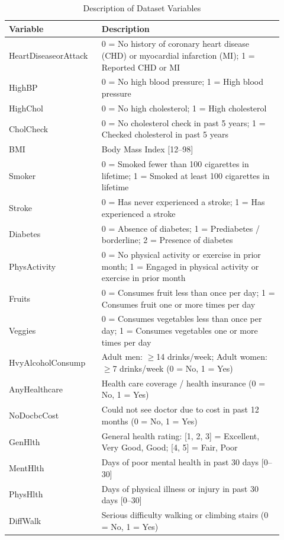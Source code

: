 \documentclass[11pt,a4paper]{article}
\begin{document}
\begin{table}[t]
\centering
\caption{Description of Dataset Variables}
\label{tab:vars}
\small
\begin{tabular}{p{0.3\linewidth}p{0.62\linewidth}}
\toprule
Variable & Description \\
\midrule
HeartDiseaseorAttack & 0 = No history of coronary heart disease (CHD) or myocardial infarction (MI); 1 = Reported CHD or MI \\
HighBP & 0 = No high blood pressure; 1 = High blood pressure \\
HighChol & 0 = No high cholesterol; 1 = High cholesterol \\
CholCheck & 0 = No cholesterol check in past 5 years; 1 = Checked cholesterol in past 5 years \\
BMI & Body Mass Index [12--98] \\
Smoker & 0 = Smoked fewer than 100 cigarettes in lifetime; 1 = Smoked at least 100 cigarettes in lifetime \\
Stroke & 0 = Has never experienced a stroke; 1 = Has experienced a stroke \\
Diabetes & 0 = Absence of diabetes; 1 = Prediabetes / borderline; 2 = Presence of diabetes \\
PhysActivity & 0 = No physical activity or exercise in prior month; 1 = Engaged in physical activity or exercise in prior month \\
Fruits & 0 = Consumes fruit less than once per day; 1 = Consumes fruit one or more times per day \\
Veggies & 0 = Consumes vegetables less than once per day; 1 = Consumes vegetables one or more times per day \\
HvyAlcoholConsump & Adult men: $\geq$14 drinks/week; Adult women: $\geq$7 drinks/week (0 = No, 1 = Yes) \\
AnyHealthcare & Health care coverage / health insurance (0 = No, 1 = Yes) \\
NoDocbcCost & Could not see doctor due to cost in past 12 months (0 = No, 1 = Yes) \\
GenHlth & General health rating: [1, 2, 3] = Excellent, Very Good, Good; [4, 5] = Fair, Poor \\
MentHlth & Days of poor mental health in past 30 days [0--30] \\
PhysHlth & Days of physical illness or injury in past 30 days [0--30] \\
DiffWalk & Serious difficulty walking or climbing stairs (0 = No, 1 = Yes) \\

\end{tabular}
\end{table}
\end{document}
